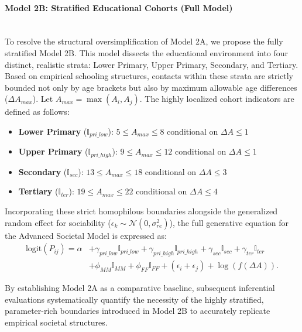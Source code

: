\paragraph*{Model 2B: Stratified Educational Cohorts (Full Model)}\mbox{}\\
To resolve the structural oversimplification of Model 2A, we propose the fully stratified Model 2B. This model dissects the educational environment into four distinct, realistic strata: Lower Primary, Upper Primary, Secondary, and Tertiary. Based on empirical schooling structures, contacts within these strata are strictly bounded not only by age brackets but also by maximum allowable age differences ($\Delta A_{max}$). Let $A_{max} = \max(A_i, A_j)$.
The highly localized cohort indicators are defined as follows:
\begin{itemize}
    \item \textbf{Lower Primary} ($\mathbb{I}_{pri\_low}$): $5 \le A_{max} \le 8$ conditional on $\Delta A \le 1$
    \item \textbf{Upper Primary} ($\mathbb{I}_{pri\_high}$): $9 \le A_{max} \le 12$ conditional on $\Delta A \le 1$
    \item \textbf{Secondary} ($\mathbb{I}_{sec}$): $13 \le A_{max} \le 18$ conditional on $\Delta A \le 3$
    \item \textbf{Tertiary} ($\mathbb{I}_{ter}$): $19 \le A_{max} \le 22$ conditional on $\Delta A \le 4$
\end{itemize}

Incorporating these strict homophilous boundaries alongside the generalized random effect for sociability ($\epsilon_k \sim \mathcal{N}(0, \sigma_{re}^2)$), the full generative equation for the Advanced Societal Model is expressed as:
\begin{equation} \label{eq:m2b_full}
\begin{aligned}
    \text{logit}(P_{ij}) = \alpha &+ \gamma_{pri\_low} \mathbb{I}_{pri\_low} + \gamma_{pri\_high} \mathbb{I}_{pri\_high} + \gamma_{sec} \mathbb{I}_{sec} + \gamma_{ter} \mathbb{I}_{ter} \\
    &+ \phi_{MM} \mathbb{I}_{MM} + \phi_{FF} \mathbb{I}_{FF} + (\epsilon_i + \epsilon_j) + \log(f(\Delta A)).
\end{aligned}
\end{equation}

By establishing Model 2A as a comparative baseline, subsequent inferential evaluations systematically quantify the necessity of the highly stratified, parameter-rich boundaries introduced in Model 2B to accurately replicate empirical societal structures.